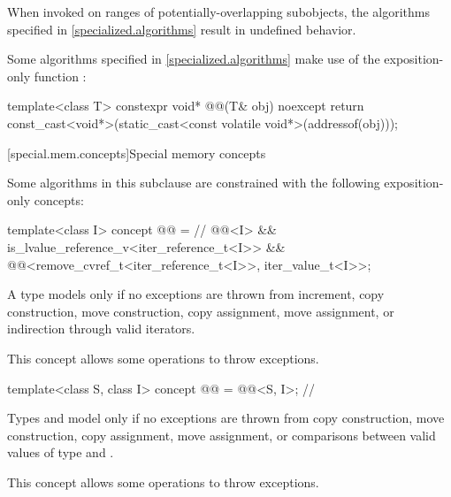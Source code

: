 \pnum
\begin{note}
When invoked on ranges of
potentially-overlapping subobjects,
the algorithms specified in \ref{specialized.algorithms}
result in undefined behavior.
\end{note}

\pnum
Some algorithms specified in \ref{specialized.algorithms} make use of the exposition-only function
:
\begin{codeblock}
template<class T>
  constexpr void* @@(T& obj) noexcept {
    return const_cast<void*>(static_cast<const volatile void*>(addressof(obj)));
  }
\end{codeblock}

[special.mem.concepts]{Special memory concepts}

\pnum
Some algorithms in this subclause are constrained with the following
exposition-only concepts:

\begin{itemdecl}
template<class I>
concept @@ = // \expos
  @@<I> &&
  is_lvalue_reference_v<iter_reference_t<I>> &&
  @@<remove_cvref_t<iter_reference_t<I>>, iter_value_t<I>>;
\end{itemdecl}

\begin{itemdescr}
\pnum
A type  models  only if
no exceptions are thrown from increment,
copy construction, move construction,
copy assignment, move assignment,
or indirection through valid iterators.

\pnum
\begin{note}
This concept allows some 
operations to throw exceptions.
\end{note}
\end{itemdescr}

\begin{itemdecl}
template<class S, class I>
concept @@ = @@<S, I>; // \expos
\end{itemdecl}

\begin{itemdescr}
\pnum
Types  and  model 
only if no exceptions are thrown from copy construction, move construction,
copy assignment, move assignment, or comparisons between
valid values of type  and .

\pnum
\begin{note}
This concept allows some 
operations to throw exceptions.
\end{note}
\end{itemdescr}

